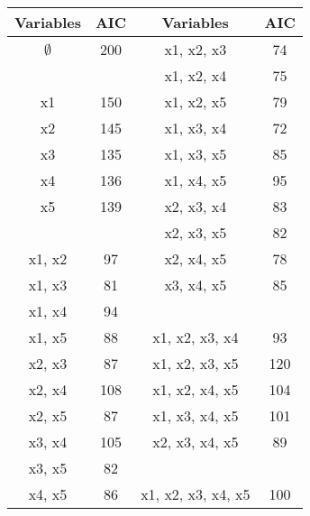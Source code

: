 {
	\large
	\begin{center}
		\begin{tabular}{||c|c||c|c||}
			\hline
			Variables & AIC & Variables & AIC \\ \hline \hline
			$\emptyset$	&	200	&	x1, x2, x3	&	74	\\ \hline
			\phantom{makemakespace}
			&	\phantom{makespace}
			&	x1, x2, x4	&	75	\\ \hline
			x1	&	150	&	x1, x2, x5	&	79	\\ \hline
			x2	&	145	&	x1, x3, x4	&	72	\\ \hline
			x3	&	135	&	x1, x3, x5	&	85	\\ \hline
			x4	&	136	&	x1, x4, x5	&	95	\\ \hline
			x5	&	139	&	x2, x3, x4	&	83	\\ \hline
			&		&	x2, x3, x5	&	82	\\ \hline
			x1, x2	&	97	&	x2, x4, x5	&	78	\\ \hline
			x1, x3	&	81	&	x3, x4, x5	&	85	\\ \hline
			x1, x4	&	94	&	\phantom{makemakespace}
			&	\phantom{makespace}
			\\ \hline
			x1, x5	&	88	&	x1, x2, x3, x4	&	93	\\ \hline
			x2, x3	&	87	&	x1, x2, x3, x5	&	120	\\ \hline
			x2, x4	&	108	&	x1, x2, x4, x5	&	104	\\ \hline
			x2, x5	&	87	&	x1, x3, x4, x5	&	101	\\ \hline
			x3, x4	&	105	&	x2, x3, x4, x5	&	89	\\ \hline
			x3, x5	&	82	&		&		\\ \hline
			x4, x5	&	86	&	x1, x2, x3, x4, x5	&	100	\\ \hline
		\end{tabular} 
	\end{center}
}
\newpage


 



